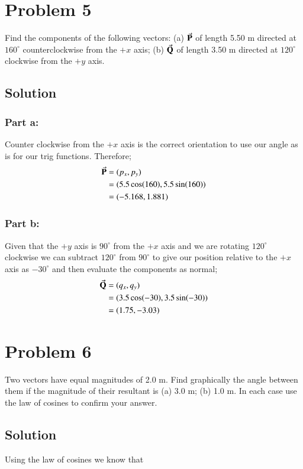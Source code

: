 \documentclass{article}
\begin{document}
\section*{Problem 5}
Find the components of the following vectors: (a) $\va P$ of length 5.50 m directed at $160^\circ$
counterclockwise from the $+x$ axis; (b) $\va Q$ of length 3.50 m directed at $120^\circ$ clockwise from the
$+y$ axis.

\subsection*{Solution}
\subsubsection*{Part a:}
Counter clockwise from the $+x$ axis is the correct orientation to use our angle as is for our trig functions. Therefore;
\begin{align*}
	\va P &= (p_x,p_y)\\
	&= (5.5\cos(160),5.5\sin(160)) \\
	&= (-5.168,1.881)
\end{align*}

\subsubsection*{Part b:}
Given that the $+y$ axis is $90^\circ$ from the $+x$ axis and we are rotating $120^\circ$ clockwise we can subtract $120^\circ$ from $90^\circ$ to give our position relative to the $+x$ axis as $-30^\circ$ and then evaluate the components as normal;
\begin{align*}
	\va Q &= (q_x,q_y)\\
	&= (3.5\cos(-30),3.5\sin(-30)) \\
	&= (1.75,-3.03)
\end{align*}

\section*{Problem 6}
Two vectors have equal magnitudes of 2.0 m. Find graphically the angle between them if the
magnitude of their resultant is (a) 3.0 m; (b) 1.0 m. In each case use the law of cosines to confirm
your answer.

\subsection*{Solution}
Using the law of cosines we know that
\end{document}

